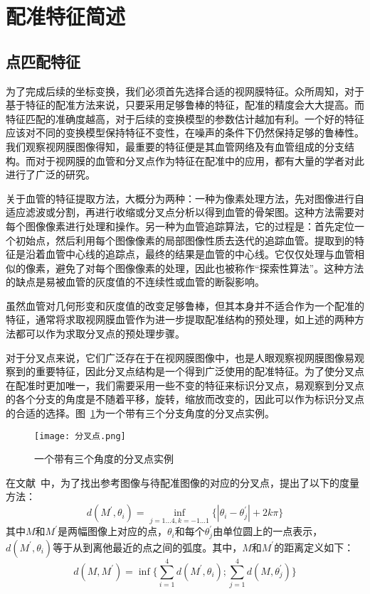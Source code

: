  \section{配准特征简述}
 \subsection{点匹配特征}
 为了完成后续的坐标变换，我们必须首先选择合适的视网膜特征。众所周知，对于基于特征的配准方法来说，只要采用足够鲁棒的特征，配准的精度会大大提高。而特征匹配的准确度越高，对于后续的变换模型的参数估计越加有利。一个好的特征应该对不同的变换模型保持特征不变性，在噪声的条件下仍然保持足够的鲁棒性。我们观察视网膜图像得知，最重要的特征便是其血管网络及有血管组成的分支结构。而对于视网膜的血管和分叉点作为特征在配准中的应用，都有大量的学者对此进行了广泛的研究。
 
关于血管的特征提取方法，大概分为两种：一种为像素处理方法，先对图像进行自适应滤波或分割，再进行收缩或分叉点分析以得到血管的骨架图。这种方法需要对每个图像像素进行处理和操作。另一种为血管追踪算法，它的过程是：首先定位一个初始点，然后利用每个图像像素的局部图像性质去迭代的追踪血管。提取到的特征是沿着血管中心线的追踪点，最终的结果是血管的中心线。它仅仅处理与血管相似的像素，避免了对每个图像像素的处理，因此也被称作“探索性算法”。这种方法的缺点是易被血管的灰度值的不连续性或血管的断裂影响。 
 
虽然血管对几何形变和灰度值的改变足够鲁棒，但其本身并不适合作为一个配准的特征，通常将求取视网膜血管作为进一步提取配准结构的预处理，如上述的两种方法都可以作为求取分叉点的预处理步骤。
 
 对于分叉点来说，它们广泛存在于在视网膜图像中，也是人眼观察视网膜图像易观察到的重要特征，因此分叉点结构是一个得到广泛使用的配准特征。为了使分叉点在配准时更加唯一，我们需要采用一些不变的特征来标识分叉点，易观察到分叉点的各个分支的角度是不随着平移，旋转，缩放而改变的，因此可以作为标识分叉点的合适的选择。图~\ref{bifur}为一个带有三个分支角度的分叉点实例。
   \begin{figure}[ht!]
   \centering
  \texttt{[image: 分叉点.png]}
  \caption{一个带有三个角度的分叉点实例}
    \label{bifur}
 \end{figure}
 
 在文献~\cite{zana}中，为了找出参考图像与待配准图像的对应的分叉点，提出了以下的度量方法：
 \begin{equation}
 d(M^{'},\theta_i)=\inf_{j=1\ldots4,k=-1\ldots1}\{|\theta_i-\theta_j^{'}|+2k\pi\}
 \end{equation}
 其中$M$和$M^{'}$是两幅图像上对应的点，$\theta_i$和每个$\theta_j^{'}$由单位圆上的一点表示，$d(M^{'},\theta_i)$等于从到离他最近的点之间的弧度。其中，$M$和$M^{'}$的距离定义如下：
  \begin{equation}
 d(M,M^{'})=\inf\Big\{\sum_{i=1}^4d(M^{'},\theta_i);\sum_{j=1}^4d(M,\theta_j^{'})\Big\}
 \end{equation}
 

